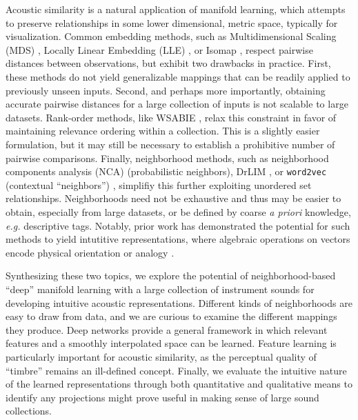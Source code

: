 \documentclass{article}
\begin{document}
Acoustic similarity is a natural application of manifold learning, which attempts to preserve relationships in some lower dimensional, metric space, typically for visualization.
Common embedding methods, such as Multidimensional Scaling (MDS) \cite{}, Locally Linear Embedding (LLE) \cite{}, or Isomap \cite{}, respect pairwise distances between observations, but exhibit two drawbacks in practice.
First, these methods do not yield generalizable mappings that can be readily applied to previously unseen inputs.
Second, and perhaps more importantly, obtaining accurate pairwise distances for a large collection of inputs is not scalable to large datasets.
Rank-order methods, like WSABIE \cite{weston2011wsabie}, relax this constraint in favor of maintaining relevance ordering within a collection.
This is a slightly easier formulation, but it may still be necessary to establish a prohibitive number of pairwise comparisons.
Finally, neighborhood methods, such as neighborhood components analysis (NCA) \cite{hinton2004neighborhood} (probabilistic neighbors), DrLIM \cite{hadsell2006drlim}, or \texttt{word2vec} (contextual ``neighbors'') \cite{mikolov2013distributed}, simplifiy this further exploiting unordered set relationships.
Neighborhoods need not be exhaustive and thus may be easier to obtain, especially from large datasets, or be defined by coarse \emph{a priori} knowledge, \emph{e.g.} descriptive tags.
Notably, prior work has demonstrated the potential for such methods to yield intutitive representations, where algebraic operations on vectors encode physical orientation \cite{hadsell2006drlim} or analogy \cite{mikolov2013efficient}.

Synthesizing these two topics, we explore the potential of neighborhood-based ``deep'' manifold learning with a large collection of instrument sounds for developing intuitive acoustic representations.
Different kinds of neighborhoods are easy to draw from data, and we are curious to examine the different mappings they produce.
Deep networks provide a general framework in which relevant features and a smoothly interpolated space can be learned.
Feature learning is particularly important for acoustic similarity, as the perceptual quality of ``timbre'' remains an ill-defined concept.
Finally, we evaluate the intuitive nature of the learned representations through both quantitative and qualitative means to identify any projections might prove useful in making sense of large sound collections.
\end{document}
